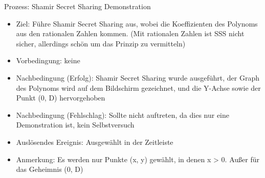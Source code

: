 \documentclass{article}
\begin{document}
\begin{FA}[start=100]
\item Prozess: Shamir Secret Sharing Demonstration
\end{FA}
\begin{itemize}[label={}]
    \item Ziel: Führe Shamir Secret Sharing
        aus, wobei die Koeffizienten des Polynoms
        aus den rationalen Zahlen kommen.
        (Mit rationalen Zahlen ist SSS nicht sicher,
        allerdings schön um das Prinzip zu vermitteln)
    \item Vorbedingung: keine
    \item Nachbedingung (Erfolg): Shamir Secret Sharing wurde
        ausgeführt, der Graph des Polynoms wird auf dem
        Bildschirm gezeichnet, und die Y-Achse
        sowie der Punkt (0, D) hervorgehoben
    \item Nachbedingung (Fehlschlag): Sollte nicht auftreten,
        da dies nur eine Demonstration ist, kein Selbstversuch
    \item Auslösendes Ereignis: Ausgewählt in der Zeitleiste
    \item Anmerkung: Es werden nur Punkte (x, y) gewählt,
        in denen x > 0. Außer für das Geheimnis (0, D)
\end{itemize}
\end{document}
